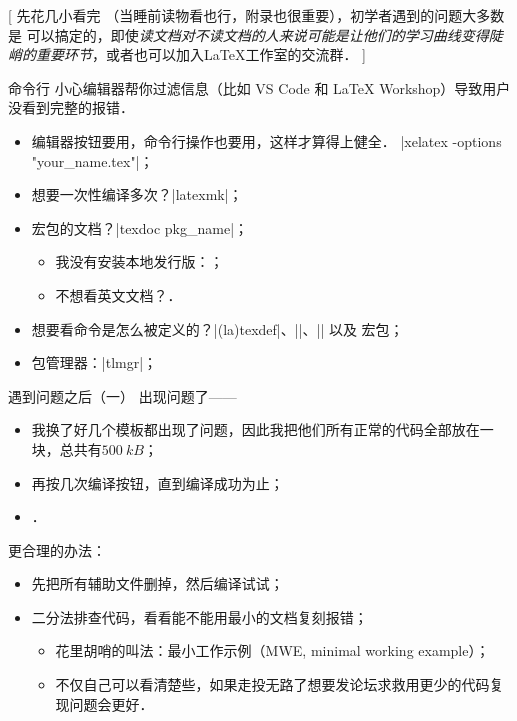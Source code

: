 [%
	先花几小看完 （当睡前读物看也行，附录也很重要），初学者遇到的问题大多数是  可以搞定的，即使\emph{读文档对不读文档的人来说可能是让他们的学习曲线变得陡峭的重要环节}，或者也可以加入LaTeX工作室的交流群．%
]

\begin{frame}[fragile]{命令行}
	小心编辑器帮你过滤信息（比如 VS Code 和 LaTeX Workshop）导致用户没看到完整的报错．
	\begin{itemize}
		\item<+-> 编辑器按钮要用，命令行操作也要用，这样才算得上健全．
		      |xelatex -options "your_name.tex"|；
		\item<+-> 想要一次性编译多次？|latexmk|；
		\item<+-> 宏包的文档？|texdoc pkg_name|；
		      \begin{itemize}
			      \item 我没有安装本地发行版：；
			      \item 不想看英文文档？．
		      \end{itemize}
		\item<+-> 想要看命令是怎么被定义的？|(la)texdef|、|\show|、|\meaning| 以及  宏包；
		\item<+-> 包管理器：|tlmgr|；
	\end{itemize}
\end{frame}


\begin{frame}[fragile]{遇到问题之后（一）}
    出现问题了——
	\begin{itemize}
		\item 我换了好几个模板都出现了问题，因此我把他们所有正常的代码全部放在一块，总共有$\qty{500}{kB}$；
		\item 再按几次编译按钮，直到编译成功为止；
		\item {}．
	\end{itemize}
	\pause 更合理的办法：
	\begin{itemize}
		\item 先把所有辅助文件删掉，然后编译试试；
		\item 二分法排查代码，看看能不能用最小的文档复刻报错；
		      \begin{itemize}
			      \item 花里胡哨的叫法：最小工作示例（MWE, minimal working example）；
			      \item 不仅自己可以看清楚些，如果走投无路了想要发论坛求救用更少的代码复现问题会更好．
		      \end{itemize}
	\end{itemize}
\end{frame}

